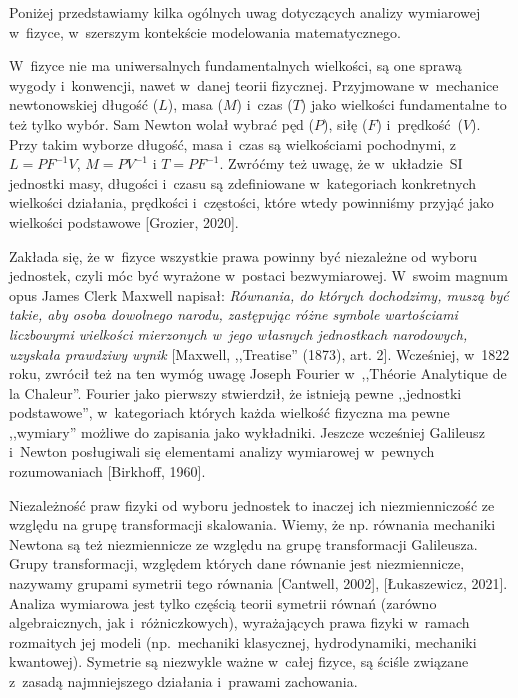 \vspace*{\parskip}
\begin{dwieszpalty}
  
Poniżej przedstawiamy kilka ogólnych uwag dotyczących analizy wymiarowej w~fizyce, w~szerszym kontekście modelowania matematycznego.

W~fizyce nie ma uniwersalnych fundamentalnych wielkości, są one sprawą wygody i~konwencji, nawet w~danej teorii fizycznej. Przyjmowane w~mechanice newtonowskiej długość ($L$), masa ($M$) i~czas ($T$) jako wielkości fundamentalne to też tylko wybór. Sam Newton wolał wybrać pęd ($P$), siłę ($F$) i~prędkość~($V$).
Przy takim wyborze długość, masa i~czas są wielkościami pochodnymi, z~${L=PF^{-1}V}$, 
$M=PV^{-1}$ i $T=PF^{-1}$. Zwróćmy też uwagę, że
w~układzie~SI jednostki masy, długości i~czasu są zdefiniowane w~kategoriach konkretnych wielkości działania, prędkości i~częstości, które wtedy powinniśmy przyjąć jako wielkości podstawowe [Grozier, 2020].

Zakłada się, że w~fizyce wszystkie prawa powinny być niezależne od wyboru jednostek, czyli móc być wyrażone w~postaci bezwymiarowej. 
W~swoim magnum
opus James Clerk Maxwell napisał:
{\it Równania, do których dochodzimy, muszą być takie, aby osoba dowolnego narodu, zastępując różne symbole wartościami liczbowymi wielkości mierzonych w~jego własnych jednostkach narodowych, uzyskała prawdziwy wynik} [Maxwell, ,,Treatise'' (1873), art. 2]. Wcześniej, w~1822 roku, zwrócił też na ten wymóg uwagę Joseph Fourier  w~,,Théorie Analytique de la Chaleur''. Fourier jako pierwszy stwierdził, że istnieją pewne ,,jednostki podstawowe'', w~kategoriach których każda wielkość fizyczna ma pewne ,,wymiary''  możliwe do zapisania jako wykładniki.
Jeszcze wcześniej Galileusz i~Newton posługiwali się elementami analizy wymiarowej w~pewnych rozumowaniach [Birkhoff, 1960].

Niezależność praw fizyki od wyboru jednostek to inaczej ich niezmienniczość ze względu na grupę transformacji skalowania. Wiemy, że np. równania mechaniki Newtona są też niezmiennicze ze względu na grupę transformacji Galileusza. 
Grupy transformacji, 
względem których dane równanie jest niezmiennicze, nazywamy grupami symetrii tego równania [Cantwell, 2002], [Łukaszewicz, 2021].
Analiza wymiarowa jest tylko częścią teorii symetrii równań (zarówno algebraicznych, jak i~różniczkowych), wyrażających prawa fizyki w~ramach rozmaitych jej modeli (np.~mechaniki klasycznej, hydrodynamiki, mechaniki kwantowej). Symetrie są niezwykle ważne w~całej fizyce, są ściśle związane z~zasadą najmniejszego działania i~prawami zachowania.
\bigskip


\end{dwieszpalty}
